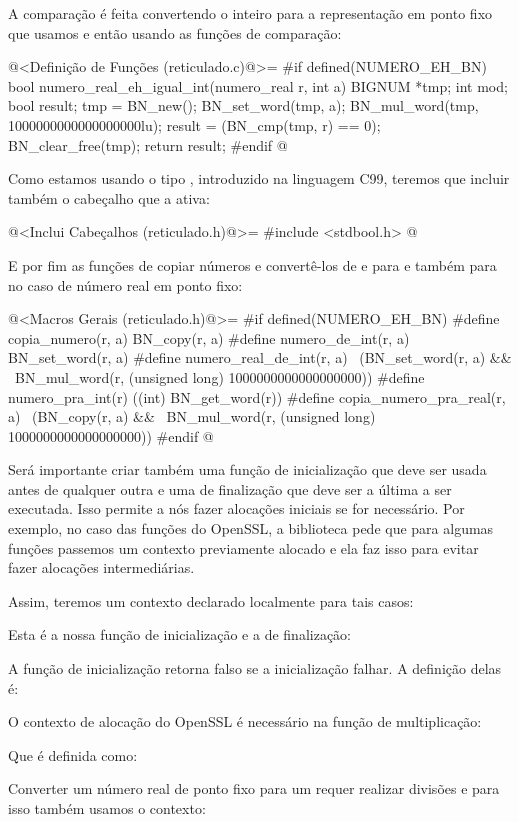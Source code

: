 A comparação é feita convertendo o inteiro para a representação em
ponto fixo que usamos e então usando as funções de comparação:

\iniciocodigo
@<Definição de Funções (reticulado.c)@>=
#if defined(NUMERO_EH_BN)
bool numero_real_eh_igual_int(numero_real r, int a){
  BIGNUM *tmp;
  int mod;
  bool result;
  tmp = BN_new();
  BN_set_word(tmp, a);
  BN_mul_word(tmp, 1000000000000000000lu);
  result = (BN_cmp(tmp, r) == 0);
  BN_clear_free(tmp);
  return result;
}
#endif
@

Como estamos usando o tipo , introduzido na linguagem
C99, teremos que incluir também o cabeçalho que a ativa:

\iniciocodigo
@<Inclui Cabeçalhos (reticulado.h)@>=
#include <stdbool.h>
@
\fimcodigo


E por fim as funções de copiar números e convertê-los de e
para  e também para  no caso de
número real em ponto fixo:

\iniciocodigo
@<Macros Gerais (reticulado.h)@>=
#if defined(NUMERO_EH_BN)
#define copia_numero(r, a) BN_copy(r, a)
#define numero_de_int(r, a) BN_set_word(r, a)
#define numero_real_de_int(r, a) \
          (BN_set_word(r, a) &&  \
           BN_mul_word(r, (unsigned long) 1000000000000000000))
#define numero_pra_int(r) ((int) BN_get_word(r))
#define copia_numero_pra_real(r, a) \
          (BN_copy(r, a) &&         \
          BN_mul_word(r, (unsigned long) 1000000000000000000))
#endif
@
\fimcodigo

Será importante criar também uma função de inicialização que deve ser
usada antes de qualquer outra e uma de finalização que deve ser a
última a ser executada. Isso permite a nós fazer alocações iniciais se
for necessário. Por exemplo, no caso das funções do OpenSSL, a
biblioteca pede que para algumas funções passemos um contexto
previamente alocado e ela faz isso para evitar fazer alocações
intermediárias.

Assim, teremos um contexto declarado localmente para tais casos:


Esta é a nossa função de inicialização e a de finalização:


A função de inicialização retorna falso se a inicialização falhar. A
definição delas é:


O contexto de alocação do OpenSSL é necessário na função de
multiplicação:


Que é definida como:


Converter um número real de ponto fixo para um 
requer realizar divisões e para isso também usamos o contexto:


